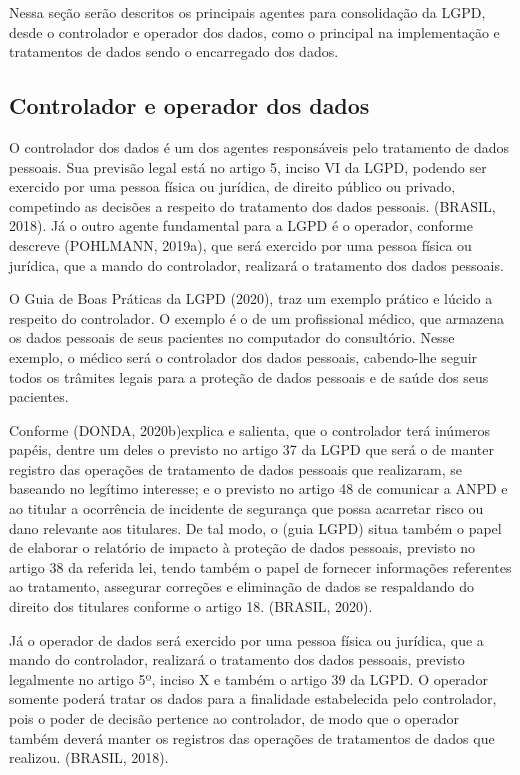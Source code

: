 \documentclass[
	12pt,				%
	openright,			%
	oneside,			%
	a4paper,			%
	english,			%
	french,				%
	spanish,			%
	brazil,				%
	]{abntex2}
\begin{document}
Nessa seção serão descritos os principais agentes para consolidação da LGPD, desde o controlador e operador dos dados, como o principal na implementação e tratamentos de dados sendo o encarregado dos dados.

\subsection{Controlador e operador dos dados}

O controlador dos dados é um dos agentes responsáveis pelo tratamento de dados pessoais. Sua previsão legal está no artigo 5, inciso VI da LGPD, podendo ser exercido por uma pessoa física ou jurídica, de direito público ou privado, competindo as decisões a respeito do tratamento dos dados pessoais. (BRASIL, 2018). Já o outro agente fundamental para a LGPD é o operador, conforme descreve (POHLMANN, 2019a), que será exercido por uma pessoa física ou jurídica, que a mando do controlador, realizará o tratamento dos dados pessoais.

O Guia de Boas Práticas da LGPD (2020), traz um exemplo prático e lúcido a respeito do controlador. O exemplo é o de um profissional médico, que armazena os dados pessoais de seus pacientes no computador do consultório. Nesse exemplo, o médico será o controlador dos dados pessoais, cabendo-lhe seguir todos os trâmites legais para a proteção de dados pessoais e de saúde dos seus pacientes.

Conforme (DONDA, 2020b)explica e salienta, que o controlador terá inúmeros papéis, dentre um deles o previsto no artigo 37 da LGPD que será o de manter registro das operações de tratamento de dados pessoais que realizaram, se baseando no legítimo interesse; e o previsto no artigo 48 de comunicar a ANPD e ao titular a ocorrência de incidente de segurança que possa acarretar risco ou dano relevante aos titulares. De tal modo, o (guia LGPD) situa também o papel de elaborar o relatório de impacto à proteção de dados pessoais, previsto no artigo 38 da referida lei, tendo também o papel de fornecer informações referentes ao tratamento, assegurar correções e eliminação de dados se respaldando do direito dos titulares conforme o artigo 18. (BRASIL, 2020).

Já o operador de dados será exercido por uma pessoa física ou jurídica, que a mando do controlador, realizará o tratamento dos dados pessoais, previsto legalmente no artigo 5º, inciso X e também o artigo 39 da LGPD. O operador somente poderá tratar os dados para a finalidade estabelecida pelo controlador, pois o poder de decisão pertence ao controlador, de modo que o operador também deverá manter os registros das operações de tratamentos de dados que realizou. (BRASIL, 2018).
\end{document}
